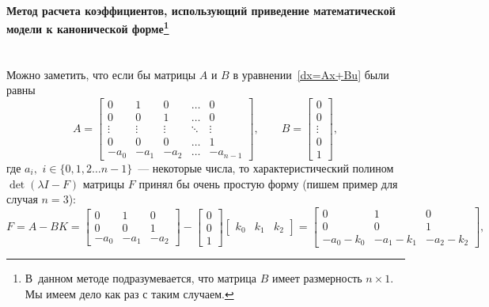 \documentclass[12pt,a4paper,openany]{extarticle}
\begin{document}
\paragraph*{Метод расчета коэффициентов, использующий приведение математической модели к канонической форме\footnote{В~данном методе подразумевается, что матрица $B$ имеет размерность $n\times1$.
Мы имеем дело как раз с таким случаем.}}$\phantom{-}$ \\
\hspace*{\parindent}Можно заметить, что если бы матрицы $A$ и $B$ в уравнении~\eqref{dx=Ax+Bu} были равны
\begin{equation}\label{dreams}
	A =
	\begin{bmatrix}
		0 & 1 & 0 & \ldots & 0\\
		0 & 0 & 1 & \ldots & 0\\
		\vdots & \vdots & \vdots & \ddots & \vdots\\
		0 & 0 & 0 & \ldots & 1\\
		-a_0 & -a_1 & -a_2 & \ldots & -a_{n-1}
	\end{bmatrix}\!\!,\qquad
	B  =
	\begin{bmatrix}
	0\\
	0\\
	\vdots\\
	0\\
	1
	\end{bmatrix}\!\!,
\end{equation}
где $a_i,$ $i\in\{0,1,2\ldots n-1\}$~--- некоторые числа,
то характеристический полином $\det(\lambda I - F)$ матрицы $F$ принял бы очень простую форму (пишем пример для случая $n = 3$):
\begin{equation}
	F = A - BK= 	
	\begin{bmatrix}
		0 & 1 & 0\\
		0 & 0 & 1\\
		-a_0 & -a_1 & -a_2 
	\end{bmatrix}-
	\begin{bmatrix}
		0\\
		0\\
		1
	\end{bmatrix}
	\begin{bmatrix}
		k_{0} & k_{1} & k_{2}
	\end{bmatrix}
	=
	\begin{bmatrix}
		0 & 1 & 0\\
		0 & 0 & 1\\
		-a_0-k_{0} & -a_1-k_{1} & -a_2-k_{2}
	\end{bmatrix}\!\!,
\end{equation}
\end{document}
